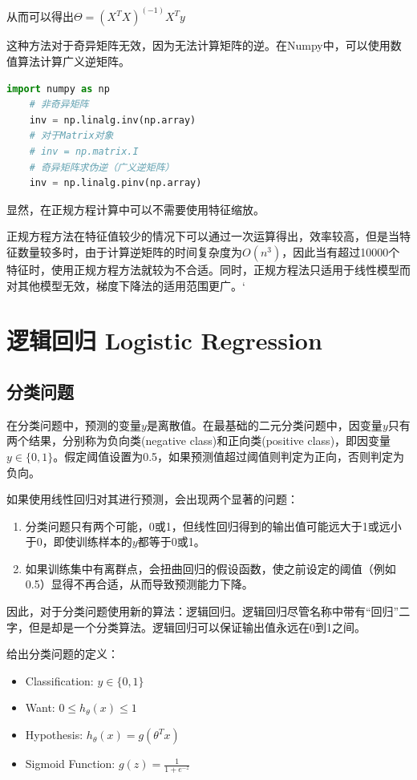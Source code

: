 \documentclass[12pt, a4paper]{article}
\begin{document}
从而可以得出$\Theta=(X^TX)^{(-1)}X^Ty$

这种方法对于奇异矩阵无效，因为无法计算矩阵的逆。在Numpy中，可以使用数值算法计算广义逆矩阵。

\begin{lstlisting}[language=Python]
    import numpy as np
    # 非奇异矩阵
    inv = np.linalg.inv(np.array)
    # 对于Matrix对象
    # inv = np.matrix.I
    # 奇异矩阵求伪逆（广义逆矩阵）
    inv = np.linalg.pinv(np.array)
\end{lstlisting}

显然，在正规方程计算中可以不需要使用特征缩放。

正规方程方法在特征值较少的情况下可以通过一次运算得出，效率较高，但是当特征数量较多时，由于计算逆矩阵的时间复杂度为$O(n^3)$，因此当有超过10000个特征时，使用正规方程方法就较为不合适。同时，正规方程法只适用于线性模型而对其他模型无效，梯度下降法的适用范围更广。‘

\section{逻辑回归 Logistic Regression}

\subsection{分类问题}

在分类问题中，预测的变量$y$是离散值。在最基础的二元分类问题中，因变量$y$只有两个结果，分别称为负向类(negative class)和正向类(positive class)，即因变量$y\in\{0, 1\}$。假定阈值设置为0.5，如果预测值超过阈值则判定为正向，否则判定为负向。

如果使用线性回归对其进行预测，会出现两个显著的问题：

\begin{enumerate}
    \item 分类问题只有两个可能，0或1，但线性回归得到的输出值可能远大于1或远小于0，即使训练样本的$y$都等于0或1。
    \item 如果训练集中有离群点，会扭曲回归的假设函数，使之前设定的阈值（例如0.5）显得不再合适，从而导致预测能力下降。
\end{enumerate}

因此，对于分类问题使用新的算法：逻辑回归。逻辑回归尽管名称中带有“回归”二字，但是却是一个分类算法。逻辑回归可以保证输出值永远在0到1之间。

给出分类问题的定义：

\begin{itemize}
    \item Classification: $y\in\{0, 1\}$
    \item Want: $0\leq h_\theta(x)\leq 1$
    \item Hypothesis: $h_\theta(x)=g(\theta^Tx)$
    \item Sigmoid Function: $g(z)=\frac{1}{1+e^{-z}}$
\end{itemize}
\end{document}
